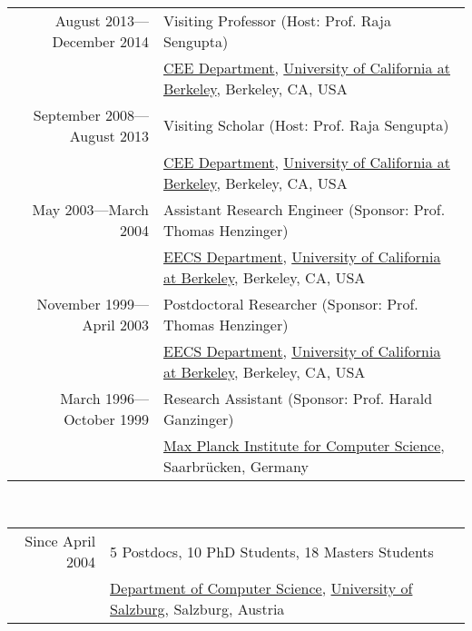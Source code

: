 \documentclass[10pt]{article}
\begin{document}
~\\[1ex]
\begin{tabular}{rl}
August 2013---December 2014 & Visiting Professor (Host: Prof. Raja Sengupta)\\
                     & \href{http://www.ce.berkeley.edu}{CEE Department}, \href{http://www.berkeley.edu}{University of California at Berkeley}, Berkeley, CA, USA \\
\noalign{\smallskip}
September 2008---August 2013 & Visiting Scholar (Host: Prof. Raja Sengupta)\\
                     & \href{http://www.ce.berkeley.edu}{CEE Department}, \href{http://www.berkeley.edu}{University of California at Berkeley}, Berkeley, CA, USA \\
\noalign{\smallskip}
May 2003---March 2004 & Assistant Research Engineer (Sponsor: Prof. Thomas Henzinger)\\
                 & \href{http://www.eecs.berkeley.edu}{EECS Department}, \href{http://www.berkeley.edu}{University of California at Berkeley}, Berkeley, CA, USA \\
\noalign{\smallskip}
November 1999---April 2003 & Postdoctoral Researcher (Sponsor: Prof. Thomas Henzinger)\\
                 & \href{http://www.eecs.berkeley.edu}{EECS Department}, \href{http://www.berkeley.edu}{University of California at Berkeley}, Berkeley, CA, USA \\
\noalign{\smallskip}
March 1996---October 1999 & Research Assistant (Sponsor: Prof. Harald Ganzinger)\\
                 & \href{http://www.mpi-sb.mpg.de}{Max Planck Institute for Computer Science}, Saarbr{\"u}cken, Germany \\
\end{tabular}

~\\[1ex]
\begin{tabular}{rl}
Since April 2004 & 5 Postdocs, 10 PhD Students, 18 Masters Students \\
                 & \href{https://informatik.uni-salzburg.at}{Department of Computer Science}, \href{https://plus.ac.at}{University of Salzburg}, Salzburg, Austria \\
\end{tabular}
\end{document}

